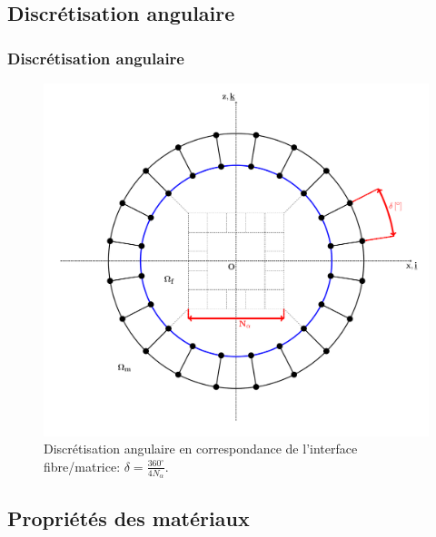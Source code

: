 \documentclass[first,firstsupp,lastsupp,handout,last,hyperref,table]{ETHclass}
\begin{document}
\subsection{Discr\'etisation angulaire}

\begin{frame}
\frametitle{Discr\'etisation angulaire}
\vspace{-0.7cm}
\centering
\captionsetup[figure]{font=scriptsize,labelfont=scriptsize}
\begin{figure}[!h]
\centering
\includegraphics[height=0.7\textheight]{mesh-disc-at-interface.pdf}
  \caption{\scriptsize Discr\'etisation angulaire en correspondance de l'interface fibre/matrice: $\delta=\frac{360^{\circ}}{4N_{\alpha}}$.}
  \label{fig:angu-discr-def}
\end{figure}
\end{frame}

\subsection{Propri\'et\'es des mat\'eriaux}
\end{document}
